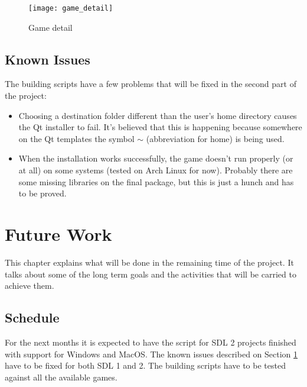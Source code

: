

\begin{figure}[h!]
\centering
\texttt{[image: game\_detail]}
\caption{Game detail}
\label{fig:game_detail}
\end{figure}

\section{Known Issues}
\label {sec:issues}

The building scripts have a few problems that will be fixed in the second part of the project:

\begin{itemize}
\item Choosing a destination folder different than the user's home directory causes the Qt installer to fail. It's believed that this is happening because somewhere on the Qt templates the symbol $\sim$ (abbreviation for home) is being used.

\item When the installation works successfully, the game doesn't run properly (or at all) on some systems (tested on Arch Linux for now). Probably there are some missing libraries on the final package, but this is just a hunch and has to be proved.
\end{itemize}


\chapter{Future Work}
\label{sec:future_work}

This chapter explains what will be done in the remaining time of the project. It talks about some of the long term goals and the activities that will be carried to achieve them.

\section{Schedule}
\label{sec:schedule}

For the next months it is expected to have the script for SDL 2 projects finished with support for Windows and MacOS. The known issues described on Section \ref{sec:issues} have to be fixed for both SDL 1 and 2. The building scripts have to be tested against all the available games.

